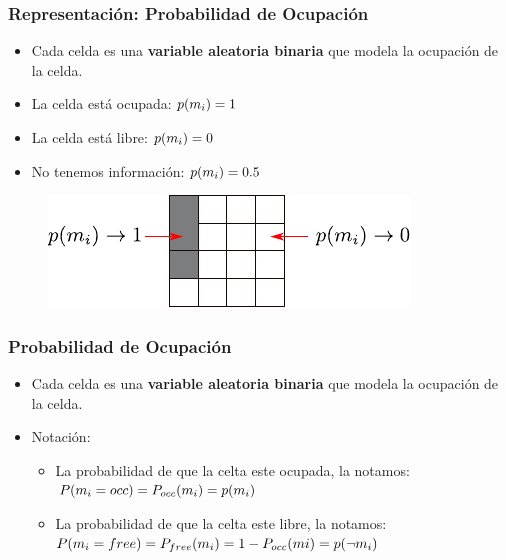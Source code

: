 \begin{frame}
	\frametitle{Representación: Probabilidad de Ocupación}

	\begin{itemize}
	\item Cada celda es una {\bf variable aleatoria binaria} que modela la ocupación de la celda.
	\item La celda está ocupada: $p(m_{i}) = 1$
	\item La celda está libre: $p(m_{i}) = 0$
	\item No tenemos información: $p(m_{i}) = 0.5$
	\end{itemize}
	
	\begin{figure}[!h]
		\includegraphics[width=0.7\columnwidth]{./images/grid_map_representation.pdf}
	\end{figure}
\end{frame}

\begin{frame}
    \frametitle{Probabilidad de Ocupación}
   	\begin{itemize}
    	\item Cada celda es una {\bf variable aleatoria binaria} que modela la ocupación de la celda.
    	\item Notación:
   	   	\begin{itemize}
    		\item La probabilidad de que la celta este ocupada, la notamos:\\ $P(m_{i} = occ) = P_{occ}(m_{i}) = p(m_{i})$
    		\item La probabilidad de que la celta este libre, la notamos:\\ $P(m_{i} = free) = P_{free}(m_{i}) = 1 - P_{occ}(m{i}) = p(\neg m_{i})$
    	\end{itemize}
    \end{itemize}
    
\end{frame}

